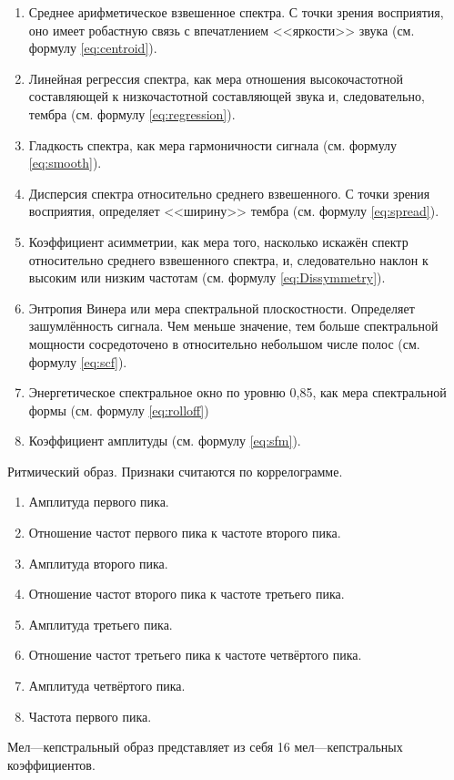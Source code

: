 \begin{enumerate}[label=\arabic*.]
\item Среднее арифметическое взвешенное спектра. С точки зрения восприятия, оно имеет робастную связь с впечатлением <<яркости>> звука (см. формулу \ref{eq:centroid}).
\item Линейная регрессия спектра, как мера отношения высокочастотной составляющей к низкочастотной составляющей звука и, следовательно, тембра (см. формулу \ref{eq:regression}).
\item Гладкость спектра, как мера гармоничности сигнала (см. формулу \ref{eq:smooth}).
\item Дисперсия спектра относительно среднего взвешенного. С точки зрения восприятия, определяет <<ширину>> тембра (см. формулу \ref{eq:spread}).
\item Коэффициент асимметрии, как мера того, насколько искажён спектр относительно среднего взвешенного спектра, и, следовательно наклон к высоким или низким частотам (см. формулу \ref{eq:Dissymmetry}).
\item Энтропия Винера или мера спектральной плоскостности. Определяет зашумлённость сигнала. Чем меньше значение, тем больше спектральной мощности сосредоточено в относительно небольшом числе полос (см. формулу \ref{eq:scf}).
\item Энергетическое спектральное окно по уровню 0,85, как мера спектральной формы (см. формулу \ref{eq:rolloff})
\item Коэффициент амплитуды (см. формулу \ref{eq:sfm}). 
\end{enumerate}

Ритмический образ.
Признаки считаются по коррелограмме.
\begin{enumerate}[label=\arabic*.]
\item Амплитуда первого пика.
\item Отношение частот первого пика к частоте второго пика.
\item Амплитуда второго пика.
\item Отношение частот второго пика к частоте третьего пика.
\item Амплитуда третьего пика.
\item Отношение частот третьего пика к частоте четвёртого пика.
\item Амплитуда четвёртого пика.
\item Частота первого пика.
\end{enumerate}

Мел—кепстральный образ представляет из себя 16 мел—кепстральных коэффициентов.
